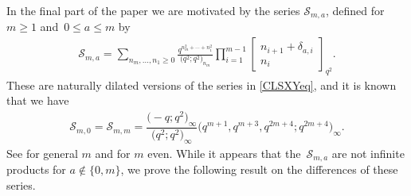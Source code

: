 \documentclass[pdftex]{sigma}
\numberwithin{equation}{section}
\begin{document}
In the final part of the paper we are motivated by the series $\mathscr{S}_{m,a}$, defined for $m \geq 1$ and~${0 \leq a \leq m}$ by
\begin{align*}
	\mathscr{S}_{m,a} = \sum_{n_m, \dots, n_1 \geq 0} \frac{q^{n_m^2 + \cdots + n_1^2}}{\bigl(q^2;q^2\bigr)_{n_m}} \prod_{i=1}^{m-1} \begin{bmatrix} n_{i+1} + \delta_{a,i} \\ n_i \end{bmatrix}_{q^2}.
\end{align*}
These are naturally dilated versions of the series in \eqref{CLSXYeq}, and it is known that we have
\begin{align} \label{eqn:Smm}
	\mathscr{S}_{m,0}=\mathscr{S}_{m,m} = \dfrac{\bigl(-q;q^2\bigr)_\infty}{\bigl(q^2;q^2\bigr)_\infty}\bigl(q^{m+1},q^{m+3},q^{2m+4}; q^{2m+4}\bigr)_\infty.
\end{align}
See \cite[Corollary 1.5\,(b)]{St} for general $m$ and \cite[Section 5]{BIS} for $m$ even. While it appears that the~$\mathscr{S}_{m,a}$ are not infinite products for $a\not \in \{0,m\}$, we prove the following result on the differences of these series.
\end{document}
